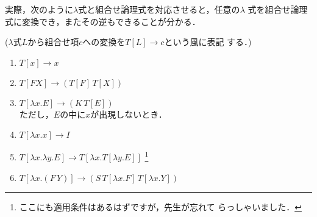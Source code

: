 実際，次のように$\lambda$式と組合せ論理式を対応させると，任意の$\lambda$
式を組合せ論理式に変換でき，またその逆もできることが分かる．

($\lambda$式$L$から組合せ項$c$への変換を$T[L] \rightarrow c$という風に表記
する．)

\begin{enumerate}
 \item $T[x] \rightarrow x$
 \item $T[FX] \rightarrow (T[F] \, T[X])$ 
 \item $T[\lambda x . E] \rightarrow (K \, T[E])$ \\
       ただし，$E$の中に$x$が出現しないとき．
 \item $T[\lambda x . x] \rightarrow I$
 \item $T[\lambda x . \lambda y . E] \rightarrow T[\lambda x . T[\lambda
       y . E]]$ \footnote{ここにも適用条件はあるはずですが，先生が忘れて
       らっしゃいました．}
 \item $T[\lambda x . (F \, Y)] \rightarrow (S \, T[\lambda x . F] \,
       T[\lambda x . Y])$
\end{enumerate}

